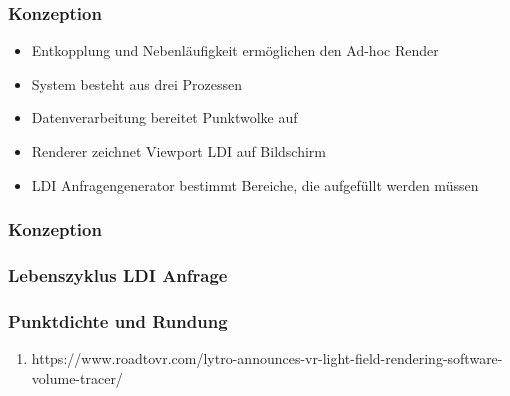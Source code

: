\documentclass[aspectratio=169]{beamer}
\begin{document}
\begin{frame}
    \frametitle{Konzeption}
    \begin{itemize}
        \item Entkopplung und Nebenläufigkeit ermöglichen den Ad-hoc Render
        \item System besteht aus drei Prozessen
        \item Datenverarbeitung bereitet Punktwolke auf
        \item Renderer zeichnet Viewport LDI auf Bildschirm
        \item LDI Anfragengenerator bestimmt Bereiche, die aufgefüllt werden müssen
    \end{itemize}
\end{frame}

\begin{frame}
    \frametitle{Konzeption}
    \begin{figure}
        \centering
        \label{fig:sysoverview}
    \end{figure}
\end{frame}

\begin{frame}
    \frametitle{Lebenszyklus LDI Anfrage}
    \begin{figure}
        \centering
        \resizebox{.6\linewidth}{!}{}%
        \label{fig:umlquerylife}
    \end{figure}
\end{frame}

\begin{frame}
    \frametitle{Punktdichte und Rundung}
    \begin{figure}
        \centering
        \label{fig:umlquerylife}
    \end{figure}
\end{frame}

\begin{frame}
    \begin{enumerate}
        \item https://www.roadtovr.com/lytro-announces-vr-light-field-rendering-software-volume-tracer/
    \end{enumerate}
\end{frame}
\end{document}
